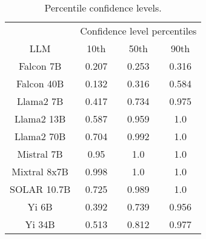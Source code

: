 \begin{table*}
\centering
\begin{tabular}{c|c|c|c}
& \multicolumn{3}{c}{Confidence level percentiles} \\ 
LLM & 10th & 50th & 90th\\ \hline
Falcon 7B & 0.207 & 0.253 & 0.316\\
Falcon 40B & 0.132 & 0.316 & 0.584\\
Llama2 7B & 0.417 & 0.734 & 0.975\\
Llama2 13B & 0.587 & 0.959 & 1.0\\
Llama2 70B & 0.704 & 0.992 & 1.0\\
Mistral 7B & 0.95 & 1.0 & 1.0\\
Mixtral 8x7B & 0.998 & 1.0 & 1.0\\
SOLAR 10.7B & 0.725 & 0.989 & 1.0\\
Yi 6B & 0.392 & 0.739 & 0.956\\
Yi 34B & 0.513 & 0.812 & 0.977\\
\hline
\end{tabular}
\caption{Percentile confidence levels.}
\label{tab:percentile_conf}
\end{table*}
